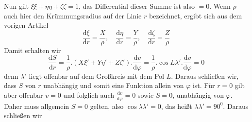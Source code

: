 Nun gilt \(\xi\xi+\eta\eta+\zeta\zeta=1\), das Differential dieser Summe ist also \(=0\). Wenn \(\rho\) auch hier den Krümmungsradius auf der Linie \(r\) bezeichnet, ergibt sich aus dem vorigen Artikel
\[
\frac{\mathrm{d}\xi}{\mathrm{d}r}=\frac{X}{\rho},\quad\frac{\mathrm{d}\eta}{\mathrm{d}r}=\frac{Y}{\rho},\quad\frac{\mathrm{d}\zeta}{\mathrm{d}r}=\frac{Z}{\rho}
\]
Damit erhalten wir
\[
\frac{\mathrm{d}S}{\mathrm{d}r}=\frac{1}{\rho}\mathord{.}(X\xi'+Y\eta'+Z\zeta')\mathord{.}\frac{\mathrm{d}v}{\mathrm{d}\varphi}=\frac{1}{\rho}\mathord{.}\cos L\lambda'\mathord{.}\frac{\mathrm{d}v}{\mathrm{d}\varphi}=0
\]
denn \(\lambda'\) liegt offenbar auf dem Großkreis mit dem Pol \(L\). Daraus schließen wir, dass \(S\) von \(r\) unabhängig und somit eine Funktion allein von \(\varphi\) ist. Für \(r=0\) gilt aber offenbar \(v=0\) und folglich auch \(\frac{\mathrm{d}v}{\mathrm{d}\varphi}=0\) sowie \(S=0\), unabhängig von \(\varphi\). Daher muss allgemein \(S=0\) gelten, also \(\cos\lambda\lambda'=0\), das heißt \(\lambda\lambda'=90^0\). Daraus schließen wir
